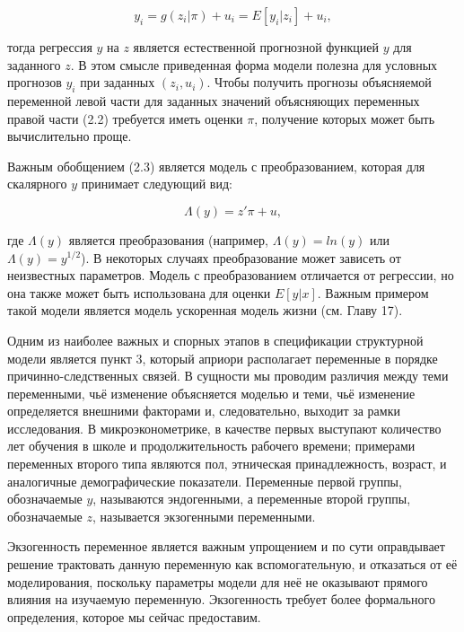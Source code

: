 	
	
\begin{equation}
y_{i}=g(z_{i}|\pi)+u_{i}=E[y_{i}|z_{i}]+u_{i},
\end{equation}

тогда  регрессия $y$ на $z$ является естественной прогнозной функцией $y$ для заданного $z$. В этом смысле приведенная форма модели полезна для условных прогнозов $y_{i}$ при заданных $(z_{i},u_{i})$. Чтобы получить прогнозы объясняемой переменной левой части  для заданных значений объясняющих переменных правой части (2.2) требуется иметь оценки $\pi$, получение которых может быть вычислительно проще. 

Важным обобщением (2.3) является  модель с преобразованием, которая для скалярного $y$ принимает следующий вид:
	
\begin{equation}
\Lambda(y)=z'\pi+u,
\end{equation}

где $\Lambda(y) $ является преобразования (например,  $\Lambda(y)=ln(y)$ или $\Lambda(y)=y^{1/2}$). В некоторых случаях преобразование может зависеть от неизвестных параметров. Модель с преобразованием  отличается от регрессии, но она также может быть использована для оценки $E[y|x]$. Важным примером такой модели является модель ускоренная модель жизни (см. Главу 17). 


Одним из наиболее важных и спорных этапов в спецификации структурной модели является пункт 3, который априори располагает переменные  в порядке причинно-следственных связей.
В сущности мы проводим различия между теми переменными, чьё изменение объясняется моделью и теми, чьё изменение определяется внешними факторами и, следовательно, выходит за рамки исследования. В микроэконометрике, в качестве первых выступают количество лет обучения в школе и продолжительность рабочего времени; примерами переменных второго типа являются пол, этническая принадлежность, возраст, и аналогичные демографические показатели. Переменные первой группы, обозначаемые $y$, называются эндогенными, а переменные второй группы, обозначаемые $z$, называется экзогенными переменными. 
	
	
Экзогенность переменное является важным упрощением и по сути оправдывает решение трактовать данную переменную как вспомогательную, и отказаться от её моделирования, поскольку параметры модели для неё не оказывают прямого влияния на изучаемую переменную.  Экзогенность требует более формального определения, которое мы сейчас предоставим. 

